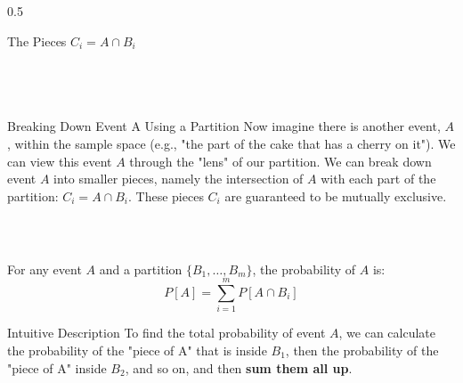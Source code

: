 \begin{frame}
\begin{columns}[T]
\begin{column}{0.5\textwidth}
\begin{block}{The Pieces \(C_i = A \cap B_i\)}
            \end{block}
        \end{column}
    \end{columns}
\end{frame}

\begin{frame}[t]
\frametitle{\ }

    \begin{block}{Breaking Down Event A Using a Partition}
        Now imagine there is another event, $A$, within the sample space (e.g., "the part of the cake that has a cherry on it"). We can view this event $A$ through the "lens" of our partition. We can break down event $A$ into smaller pieces, namely the intersection of $A$ with each part of the partition: $C_i = A \cap B_i$. These pieces $C_i$ are guaranteed to be mutually exclusive.
    \end{block}
\end{frame}

\begin{frame}[t]
\frametitle{\ }
    \begin{Teorema}
    \label{teorema:hukumprobabilitastotal1}
      For any event $A$ and a partition $\{B_1, \dots, B_m\}$, the probability of $A$ is:
      \[
        P[A] = \sum_{i=1}^{m} P[A \cap B_i]
      \]
    \end{Teorema}

    \begin{alertblock}{Intuitive Description}
      To find the total probability of event $A$, we can calculate the probability of the "piece of A" that is inside $B_1$, then the probability of the "piece of A" inside $B_2$, and so on, and then \textbf{sum them all up}.
    \end{alertblock}
\end{frame}

